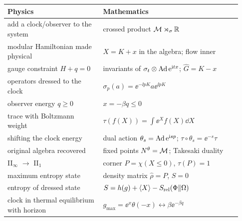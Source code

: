 \begin{dictbox}
\renewcommand{\arraystretch}{1.3}
\begin{tabular}{@{}p{0.38\linewidth}p{0.55\linewidth}@{}}
\textbf{Physics} & \textbf{Mathematics}\\
\hline
add a clock/observer to the system & crossed product $\mathcal{M}\rtimes_\sigma\mathbb{R}$\\
modular Hamiltonian made physical & $X=K+x$ in the algebra; flow inner\\
gauge constraint $H+q=0$ & invariants of $\sigma_t\otimes\operatorname{Ad}\mathrm{e}^{\mathrm{i} tx}$; $\hat G=K-x$\\
operators dressed to the clock & $\sigma_p(a)=\ee^{-\ii pK}a\ee^{\ii pK}$\\
observer energy $q\ge0$ & $x=-\beta q\le0$\\
trace with Boltzmann weight & $\tau(f(X))=\int\ee^Xf(X)\dd X$\\
shifting the clock energy & dual action $\theta_s=\operatorname{Ad}\mathrm{e}^{\mathrm{i} sp}$; $\tau\circ\theta_s=\ee^{-s}\tau$\\
original algebra recovered & fixed points $N^\theta=\mathcal{M}$; Takesaki duality\\
II$_\infty$ $\to$ II$_1$ & corner $P=\chi(X\le0)$, $\tau(P)=1$\\
maximum entropy state & density matrix $\hat\rho=P$, $S=0$\\
entropy of dressed state & $S=h(g)+\langle X\rangle-S_{\rm rel}(\Phi\|\Omega)$\\
clock in thermal equilibrium with horizon & $g_{\max}=\ee^{x}\theta(-x)\leftrightarrow\beta\ee^{-\beta q}$\\
\end{tabular}
\end{dictbox}
